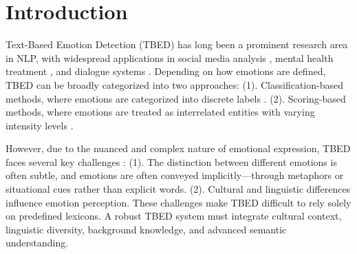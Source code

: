 \documentclass[11pt]{article}
\begin{document}
\section{Introduction}

Text-Based Emotion Detection (TBED) has long been a prominent research area in NLP, with widespread applications in social media analysis \cite{kuamri2017real, salam2018emotion, cassab2020ontology}, mental health treatment \cite{kusal2021ai, krommyda2021experimental}, and dialogue systems \cite{liu2022dialogueein,ide2022building,hu2021dialoguecrn}. Depending on how emotions are defined, TBED can be broadly categorized into two approaches: (1). Classification-based methods, where emotions are categorized into discrete labels \cite{ekman1969repertoire,plutchik1982psycho}. (2). Scoring-based methods, where emotions are treated as interrelated entities with varying intensity levels \cite{russell1977evidence}. 

However, due to the nuanced and complex nature of emotional expression, TBED faces several key challenges \cite{al2024challenges}: (1). The distinction between different emotions is often subtle, and emotions are often conveyed implicitly—through metaphors or situational cues rather than explicit words. (2). Cultural and linguistic differences influence emotion perception. These challenges make TBED difficult to rely solely on predefined lexicons. A robust TBED system must integrate cultural context, linguistic diversity, background knowledge, and advanced semantic understanding.
\end{document}
